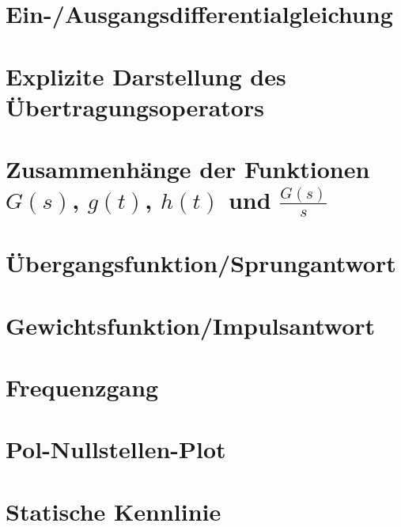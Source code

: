 \documentclass[
  ngerman
  ,12pt
  ,pdftex
]{article}
\begin{document}
\section{Ein-/Ausgangsdifferentialgleichung}    %


\section{Explizite Darstellung des Übertragungsoperators}


\section{Zusammenhänge der Funktionen $G(s)$, $g(t)$, $h(t)$ und $\frac{G(s)}{s}$}


\newpage
\section{Übergangsfunktion/Sprungantwort}


\section{Gewichtsfunktion/Impulsantwort}


\section{Frequenzgang}


\section{Pol-Nullstellen-Plot}


\section{Statische Kennlinie}

\end{document}
